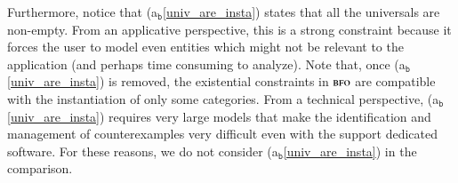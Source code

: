 \documentclass[ao]{iosart2x}
\newcommand{\bfoAxLabel}{\textrm{a$_\texttt{b}$}}
\newcommand{\bdDefLabel}{\textrm{d$_\texttt{bd}$}}
\newcommand{\refbfoax}[1]{({\bfoAxLabel}\ref{#1})}
\newcommand{\refbddf}[1]{({\bdDefLabel}\ref{#1})}
\newcommand{\cn}[1]{\mathtt{#1}}
\newcommand{\dolce}{{\textsc{dolce}}}
\newcommand{\bfo}{{\textsc{bfo}}}
\newcommand {\EDdcat} {\textsc{ed}}
\newcommand {\NPEDdcat} {\textsc{nped}}
\newcommand {\PEDdcat} {\textsc{ped}}
\newcommand{\gdcntbcat}{\cn{gdcnt}}
\newcommand{\bfoiof}[1]{{\,::_{#1\:\!}}}
\begin{document}
%


Furthermore, notice that \refbfoax{univ_are_insta} states that all the universals are non-empty. From an applicative perspective, this is a strong constraint because it forces the user to model even entities which might not be relevant to the application (and perhaps time consuming to analyze). Note that, once \refbfoax{univ_are_insta} is removed, the existential constraints in $\bfo$ are compatible with the instantiation of only some categories. From a technical perspective, \refbfoax{univ_are_insta} requires very large models that make the identification and management of counterexamples very difficult even with the support dedicated software. For these reasons, we do not consider \refbfoax{univ_are_insta} in the comparison.   
\end{document}
